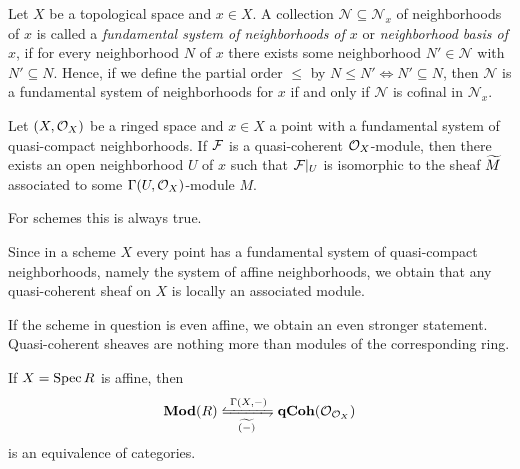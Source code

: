 \begin{definition}
	Let $X$ be a topological space and $x\in X$. A collection $\mathcal N\subseteq \mathcal N_x$ of neighborhoods of $x$ is called a \emph{fundamental system of neighborhoods of $x$} or \emph{neighborhood basis of $x$}, if for every neighborhood $N$ of $x$ there exists some neighborhood $N' \in \mathcal N$ with $N'\subseteq N$. Hence, if we define the partial order $\le$ by $N \le N' \Leftrightarrow N'\subseteq N$, then $\mathcal N$ is a fundamental system of neighborhoods for $x$ if and only if $\mathcal N$ is cofinal in $\mathcal N_x$.
\end{definition}

\begin{lemma}
	
	Let $(X,{{\mathcal{O}}_{X}})$ be a ringed space and $x\in X$ a point with a fundamental system of quasi-compact neighborhoods. If ${\mathcal{F}}$ is a quasi-coherent ${{\mathcal{O}}_{X}}$-module, then there exists an open neighborhood $U$ of $x$ such that ${\mathcal{F}}\vert_U$ is isomorphic to the sheaf $\widetilde{M}$ associated to some $\Gamma(U, {{\mathcal{O}}_{X}})$-module $M$.
\end{lemma}

For schemes this is always true.
\begin{corollary}
	Since in a scheme $X$ every point has a fundamental system of quasi-compact neighborhoods, namely the system of affine neighborhoods, we obtain that any quasi-coherent sheaf on $X$ is locally an associated module.
\end{corollary}

If the scheme in question is even affine, we obtain an even stronger statement. Quasi-coherent sheaves are nothing more than modules of the corresponding ring.
\begin{remark}
	\label{remark: quasi-coherent sheaves of affine schemes}
	
	If $X=\operatorname{Spec} R$ is affine, then 
	$$\mod{R} \xleftrightarrows{\Gamma(X, -)}{\associatedSheaf{(-)}} \qCoh{\struct{X}}$$
	is an equivalence of categories.
\end{remark}

